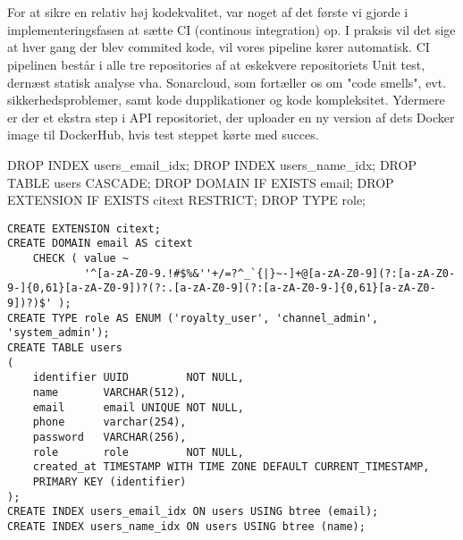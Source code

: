 \\

\\

For at sikre en relativ høj kodekvalitet, var noget af det første vi gjorde i implementeringsfasen at sætte CI (continous integration) op. I praksis vil det sige at hver gang der blev commited kode, vil vores pipeline kører automatisk. CI pipelinen består i alle tre repositories af at eskekvere repositoriets Unit test, dernæst statisk analyse vha. Sonarcloud, som fortæller os om "code smells", evt. sikkerhedsproblemer, samt kode dupplikationer og kode kompleksitet. Ydermere er der et ekstra step i API repositoriet, der uploader en ny version af dets Docker image til DockerHub, hvis test steppet kørte med succes.\\



\begin{code}[caption=Downgrade.sql, firstnumber=1]
DROP INDEX users_email_idx;
DROP INDEX users_name_idx;
DROP TABLE users CASCADE;
DROP DOMAIN IF EXISTS email;
DROP EXTENSION IF EXISTS citext RESTRICT;
DROP TYPE role;
\end{code}


\begin{lstlisting}[caption=users.sql, firstnumber=1]
CREATE EXTENSION citext;
CREATE DOMAIN email AS citext
    CHECK ( value ~
            '^[a-zA-Z0-9.!#$%&''+/=?^_`{|}~-]+@[a-zA-Z0-9](?:[a-zA-Z0-9-]{0,61}[a-zA-Z0-9])?(?:.[a-zA-Z0-9](?:[a-zA-Z0-9-]{0,61}[a-zA-Z0-9])?)$' );
CREATE TYPE role AS ENUM ('royalty_user', 'channel_admin', 'system_admin');
CREATE TABLE users
(
    identifier UUID         NOT NULL,
    name       VARCHAR(512),
    email      email UNIQUE NOT NULL,
    phone      varchar(254),
    password   VARCHAR(256),
    role       role         NOT NULL,
    created_at TIMESTAMP WITH TIME ZONE DEFAULT CURRENT_TIMESTAMP,
    PRIMARY KEY (identifier)
);
CREATE INDEX users_email_idx ON users USING btree (email);
CREATE INDEX users_name_idx ON users USING btree (name);
\end{lstlisting}



